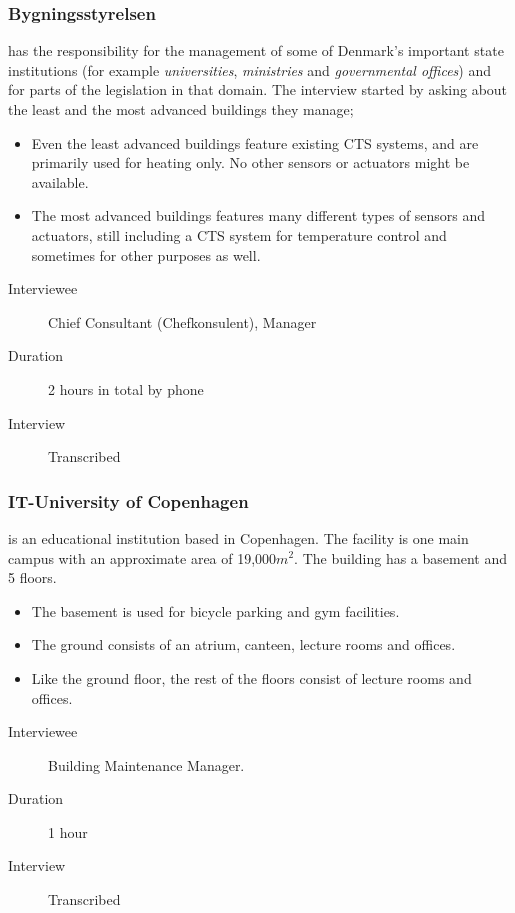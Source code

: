 \subsubsection{Bygningsstyrelsen} has the responsibility for the management of some of Denmark's important state institutions (for example \textit{universities}, \textit{ministries} and \textit{governmental offices}) and for parts of the legislation in that domain. The interview started by asking about the least and the most advanced buildings they manage;
\begin{itemize}
	\item Even the least advanced buildings feature existing CTS systems, and are primarily used for heating only. No other sensors or actuators might be available.
	\item The most advanced buildings features many different types of sensors and actuators, still including a CTS system for temperature control and sometimes for other purposes as well. 
\end{itemize}	
\begin{description}
	\item[Interviewee] Chief Consultant (Chefkonsulent), Manager
	\item[Duration] 2 hours in total by phone
	\item[Interview] Transcribed
\end{description}

\subsubsection{IT-University of Copenhagen} is an educational institution based in Copenhagen. The facility is one main campus with an approximate area of 19,000$m^2$. The building has a basement and 5 floors.
\begin{itemize}
	\item The basement is used for bicycle parking and gym facilities.
	\item The ground consists of an atrium, canteen, lecture rooms and offices.
	\item Like the ground floor, the rest of the floors consist of lecture rooms and offices.
\end{itemize}
\begin{description}
	\item[Interviewee] Building Maintenance Manager.
	\item[Duration] 1 hour
	\item[Interview] Transcribed
\end{description}

